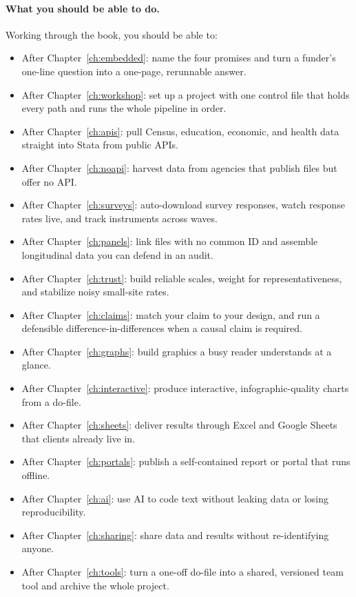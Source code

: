 \documentclass[
    a4paper,
    fontsize=10pt,
    twoside=true,
    numbers=noenddot,
]{kaobook}
\begin{document}
\paragraph{What you should be able to do.} Working through the book, you should be able to:
\begin{itemize}
    \item After Chapter~\ref{ch:embedded}: name the four promises and turn a funder's one-line question into a one-page, rerunnable answer.
    \item After Chapter~\ref{ch:workshop}: set up a project with one control file that holds every path and runs the whole pipeline in order.
    \item After Chapter~\ref{ch:apis}: pull Census, education, economic, and health data straight into Stata from public APIs.
    \item After Chapter~\ref{ch:noapi}: harvest data from agencies that publish files but offer no API.
    \item After Chapter~\ref{ch:surveys}: auto-download survey responses, watch response rates live, and track instruments across waves.
    \item After Chapter~\ref{ch:panels}: link files with no common ID and assemble longitudinal data you can defend in an audit.
    \item After Chapter~\ref{ch:trust}: build reliable scales, weight for representativeness, and stabilize noisy small-site rates.
    \item After Chapter~\ref{ch:claims}: match your claim to your design, and run a defensible difference-in-differences when a causal claim is required.
    \item After Chapter~\ref{ch:graphs}: build graphics a busy reader understands at a glance.
    \item After Chapter~\ref{ch:interactive}: produce interactive, infographic-quality charts from a do-file.
    \item After Chapter~\ref{ch:sheets}: deliver results through Excel and Google Sheets that clients already live in.
    \item After Chapter~\ref{ch:portals}: publish a self-contained report or portal that runs offline.
    \item After Chapter~\ref{ch:ai}: use AI to code text without leaking data or losing reproducibility.
    \item After Chapter~\ref{ch:sharing}: share data and results without re-identifying anyone.
    \item After Chapter~\ref{ch:tools}: turn a one-off do-file into a shared, versioned team tool and archive the whole project.
\end{itemize}
\end{document}
